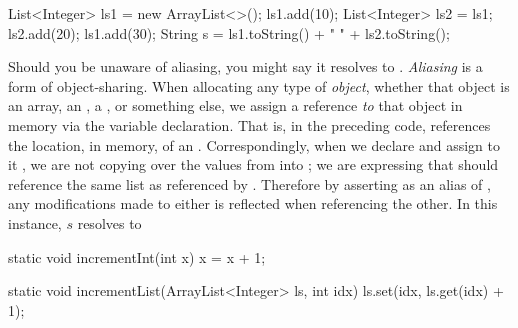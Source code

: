 \begin{verbnobox}[\small]
List<Integer> ls1 = new ArrayList<>();
ls1.add(10);
List<Integer> ls2 = ls1;
ls2.add(20);
ls1.add(30);
String s = ls1.toString() + " " + ls2.toString();
\end{verbnobox}
Should you be unaware of aliasing, you might say it resolves to . \emph{Aliasing} is a form of object-sharing. When allocating any type of \emph{object}, whether that object is an array, an , a , or something else, we assign a reference \emph{to} that object in memory via the variable declaration. That is, in the preceding code,  references the location, in memory, of an . Correspondingly, when we declare  and assign to it , we are not copying over the values from  into ; we are expressing that  should reference the same list as referenced by . Therefore by asserting  as an alias of , any modifications made to either is reflected when referencing the other. In this instance, $s$ resolves to 


\begin{verbnobox}[\small]
static void incrementInt(int x) {
  x = x + 1;
}

static void incrementList(ArrayList<Integer> ls, int idx) {
  ls.set(idx, ls.get(idx) + 1);
}
\end{verbnobox}

